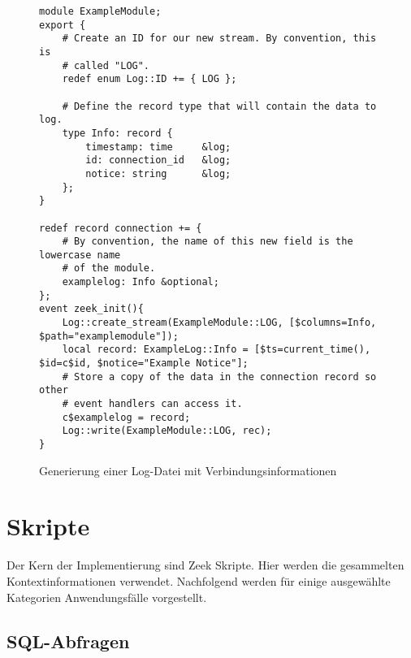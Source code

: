 \begin{figure}[H]
\centering
\begin{lstlisting}
module ExampleModule;
export {
    # Create an ID for our new stream. By convention, this is
    # called "LOG".
    redef enum Log::ID += { LOG };

    # Define the record type that will contain the data to log.
    type Info: record {
        timestamp: time		&log;
        id: connection_id	&log; 
        notice: string		&log;
    };
}

redef record connection += {
    # By convention, the name of this new field is the lowercase name
    # of the module.
    examplelog: Info &optional;
};
event zeek_init(){
	Log::create_stream(ExampleModule::LOG, [$columns=Info, $path="examplemodule"]);
	local record: ExampleLog::Info = [$ts=current_time(), $id=c$id, $notice="Example Notice"];
    # Store a copy of the data in the connection record so other
    # event handlers can access it.
    c$examplelog = record;
    Log::write(ExampleModule::LOG, rec);
}
\end{lstlisting}
\caption{Generierung einer Log-Datei mit Verbindungsinformationen}
\end{figure}
\newpage
\section{Skripte}
Der Kern der Implementierung sind Zeek Skripte. Hier werden die gesammelten Kontextinformationen verwendet. Nachfolgend werden für einige ausgewählte Kategorien Anwendungsfälle vorgestellt.

\subsection{SQL-Abfragen}
